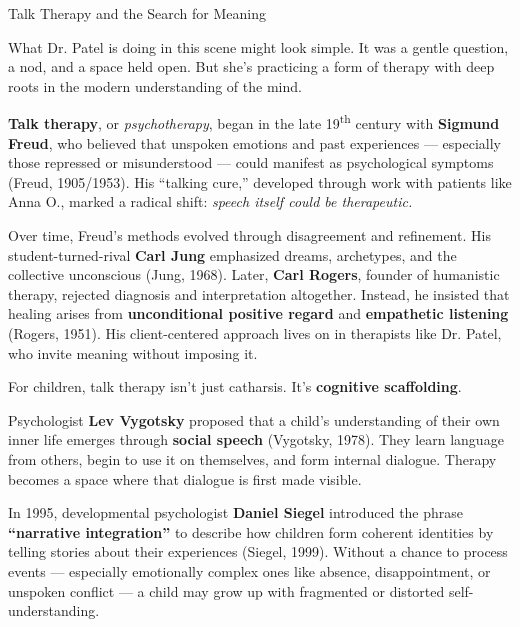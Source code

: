 \begin{PsychologicalSidebar}{Talk Therapy and the Search for Meaning}

  What Dr. Patel is doing in this scene might look simple. It was a gentle question, a nod, and 
  a space held open. But she’s practicing a form of therapy with deep roots in the modern 
  understanding of the mind.
  
  \medskip
  
  \textbf{Talk therapy}, or \textit{psychotherapy}, began in the late 19\textsuperscript{th} century 
  with \textbf{Sigmund Freud}, who believed that unspoken emotions and past experiences — especially 
  those repressed or misunderstood — could manifest as psychological symptoms 
  (Freud, 1905/1953). His ``talking cure,'' developed through work with patients like Anna O., marked 
  a radical shift: \textit{speech itself could be therapeutic.}
  
  \medskip
  
  Over time, Freud’s methods evolved through disagreement and refinement. His student-turned-rival 
  \textbf{Carl Jung} emphasized dreams, archetypes, and the collective unconscious (Jung, 1968). 
  Later, \textbf{Carl Rogers}, founder of humanistic therapy, rejected diagnosis and interpretation 
  altogether. Instead, he insisted that healing arises from \textbf{unconditional positive regard} 
  and \textbf{empathetic listening} (Rogers, 1951). His client-centered approach lives on in 
  therapists like Dr. Patel, who invite meaning without imposing it.
  
  \medskip
  
  For children, talk therapy isn’t just catharsis. It’s \textbf{cognitive scaffolding}.

  \medskip
  
  Psychologist \textbf{Lev Vygotsky} proposed that a child’s understanding of their own inner life 
  emerges through \textbf{social speech} (Vygotsky, 1978). They learn language from others, begin to 
  use it on themselves, and form internal dialogue. Therapy becomes a space where that dialogue is 
  first made visible.
  
  \medskip
  
  In 1995, developmental psychologist \textbf{Daniel Siegel} introduced the phrase \textbf{“narrative 
  integration”} to describe how children form coherent identities by telling stories about their 
  experiences (Siegel, 1999). Without a chance to process events — especially emotionally complex ones 
  like absence, disappointment, or unspoken conflict — a child may grow up with fragmented or distorted 
  self-understanding.
  

\end{PsychologicalSidebar}
